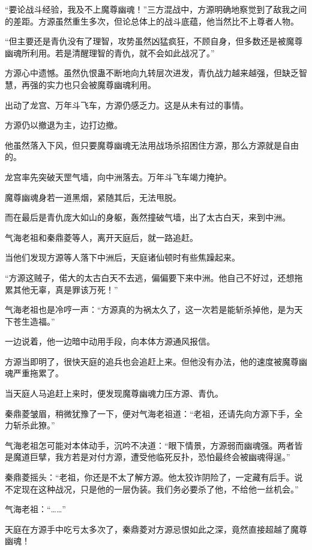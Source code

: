
\begin{this_body}

“要论战斗经验，我及不上魔尊幽魂！”三方混战中，方源明确地察觉到了敌我之间的差距。方源虽然重生多次，但论总体上的战斗底蕴，他当然比不上尊者人物。

“但主要还是青仇没有了理智，攻势虽然凶猛疯狂，不顾自身，但多数还是被魔尊幽魂所利用。若是清醒理智的青仇，就不会如此战况了。”

方源心中遗憾。虽然仇恨蛊不断地向九转层次进发，青仇战力越来越强，但缺乏智慧，再强的实力也只会被魔尊幽魂利用。

出动了龙宫、万年斗飞车，方源仍感乏力。这是从未有过的事情。

方源仍以撤退为主，边打边撤。

他虽然落入下风，但只要魔尊幽魂无法用战场杀招困住方源，那么方源就是自由的。

龙宫率先突破天罡气墙，向中洲落去。万年斗飞车竭力掩护。

魔尊幽魂身若一道黑烟，紧随其后，无法甩脱。

而在最后是青仇庞大如山的身躯，轰然撞破气墙，出了太古白天，来到中洲。

气海老祖和秦鼎菱等人，离开天庭后，就一路追赶。

当他们发现方源等人落下中洲后，天庭诸仙顿时有些焦躁起来。

“方源这贼子，偌大的太古白天不去逃，偏偏要下来中洲。他自己不好过，还想拖累其他无辜，真是罪该万死！”

气海老祖也是冷哼一声：“方源真的为祸太久了，这一次若是能斩杀掉他，是为天下苍生造福。”

一边说着，他一边暗中动用手段，向本体方源通风报信。

方源当即明了，很快天庭的追兵也会追赶上来。但他没有办法，他的速度被魔尊幽魂严重拖累了。

当天庭人马追赶上来时，便发现魔尊幽魂力压方源、青仇。

秦鼎菱皱眉，稍微犹豫了一下，便对气海老祖道：“老祖，还请先向方源下手，全力斩杀此獠。”

气海老祖怎可能对本体动手，沉吟不决道：“眼下情景，方源弱而幽魂强。两者皆是魔道巨擘，我方若是对付方源，遭受他临死反扑，恐怕最终会被幽魂得逞。”

秦鼎菱摇头：“老祖，你还是不太了解方源。他太狡诈阴险了，一定藏有后手。说不定现在这种战况，只是他的一层伪装。我们务必要杀了他，不给他一丝机会。”

气海老祖：“……”

天庭在方源手中吃亏太多次了，秦鼎菱对方源忌恨如此之深，竟然直接超越了魔尊幽魂！


\end{this_body}
